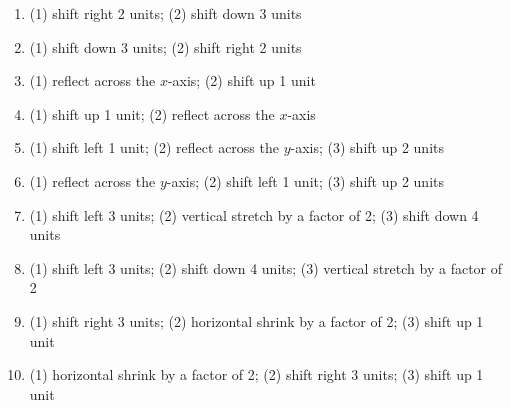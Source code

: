 \begin{enumerate}
\setcounter{enumi}{\value{HW}}


\item  (1) shift right 2 units; (2) shift down 3 units

\item  (1) shift down 3 units; (2) shift right 2 units

\item  (1) reflect across the $x$-axis; (2) shift up 1 unit

\item  (1) shift up 1 unit; (2) reflect across the $x$-axis

\item  (1) shift left 1 unit; (2) reflect across the $y$-axis; (3) shift up 2 units

\item  (1) reflect across the $y$-axis;  (2) shift left 1 unit;  (3) shift up 2 units

\item  (1) shift left 3 units; (2) vertical stretch by a factor of 2; (3) shift down 4 units

\item  (1) shift left 3 units; (2) shift down 4 units; (3) vertical stretch by a factor of 2

\item  (1) shift right 3 units; (2) horizontal shrink by a factor of 2; (3) shift up 1 unit

\item  (1) horizontal shrink by a factor of 2; (2) shift right 3 units; (3) shift up 1 unit


\setcounter{HW}{\value{enumi}}
\end{enumerate}


\newpage

